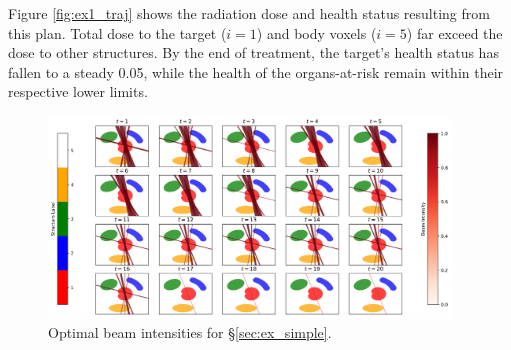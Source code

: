 \documentclass[12pt]{article}
\begin{document}
Figure \ref{fig:ex1_traj} shows the radiation dose and health status resulting from this plan. Total dose to the target ($i=1$) and body voxels ($i=5$) far exceed the dose to other structures. By the end of treatment, the target's health status has fallen to a steady 0.05, while the health of the organs-at-risk remain within their respective lower limits.

\begin{figure}
	\begin{center}
		\includegraphics[width=0.95\textwidth]{figures/ex1_beams.png}
	\end{center}
	\caption{Optimal beam intensities for \S\ref{sec:ex_simple}.}
	\label{fig:ex1_beams}
\end{figure}
\end{document}
